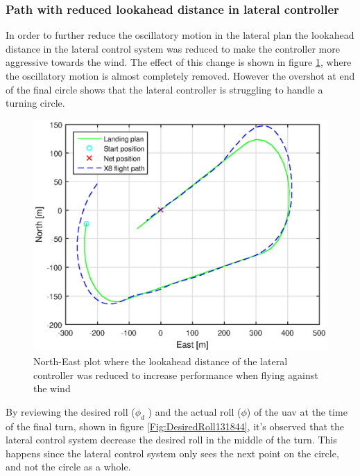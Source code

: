 \subsubsection{Path with reduced lookahead distance in lateral controller}
In order to further reduce the oscillatory motion in the lateral plan the lookahead distance in the lateral control system was reduced to make the controller more aggressive towards the wind. The effect of this change is shown in figure \ref{Fig:NorthEast31mai131844}, where the oscillatory motion is almost completely removed. However the overshot at end of the final circle shows that the lateral controller is struggling to handle a turning circle. 
\begin{figure}[H]
\centering
\includegraphics[scale=0.7]{figs/Experiment/NorthEast31mai131844.eps}
\caption{North-East plot where the lookahead distance of the lateral controller was reduced to increase performance when flying against the wind}
\label{Fig:NorthEast31mai131844}
\end{figure}
By reviewing the desired roll ($\phi_d$ ) and the actual roll ($\phi$) of the \gls{uav} at the time of the final turn, shown in figure \ref{Fig:DesiredRoll131844}, it's observed that the lateral control system decrease the desired roll in the middle of the turn. This happens since the lateral control system only sees the next point on the circle, and not the circle as a whole.
